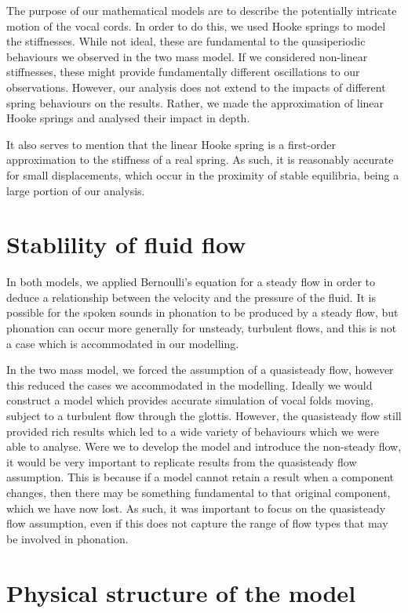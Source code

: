 \documentclass{report}
\begin{document}
The purpose of our mathematical models are to describe the potentially intricate motion of the vocal cords.
In order to do this,
we used Hooke springs to model the stiffnesses.
While not ideal, these are fundamental to the quasiperiodic behaviours we observed in the two mass model.
If we considered non-linear stiffnesses,
these might provide fundamentally different oscillations to our observations.
However, our analysis does not extend to the impacts of different spring behaviours on the results.
Rather, we made the approximation of linear Hooke springs and analysed their impact in depth.

It also serves to mention that the linear Hooke spring is a first-order approximation to the stiffness of a real spring.
As such, it is reasonably accurate for small displacements,
which occur in the proximity of stable equilibria,
being a large portion of our analysis.

\section{Stablility of fluid flow}

In both models,
we applied Bernoulli's equation for a steady flow in order to deduce a relationship between the velocity and the pressure of the fluid.
It is possible for the spoken sounds in phonation to be produced by a steady flow,
but phonation can occur more generally for unsteady, turbulent flows,
and this is not a case which is accommodated in our modelling.

In the two mass model,
we forced the assumption of a quasisteady flow,
however this reduced the cases we accommodated in the modelling.
Ideally we would construct a model which provides accurate simulation of vocal folds moving, subject to a turbulent flow through the glottis.
However, the quasisteady flow still provided rich results which led to a wide variety of behaviours which we were able to analyse.
Were we to develop the model and introduce the non-steady flow,
it would be very important to replicate results from the quasisteady flow assumption.
This is because if a model cannot retain a result when a component changes,
then there may be something fundamental to that original component,
which we have now lost.
As such,
it was important to focus on the quasisteady flow assumption,
even if this does not capture the range of flow types that may be involved in phonation.

\section{Physical structure of the model}
\end{document}

